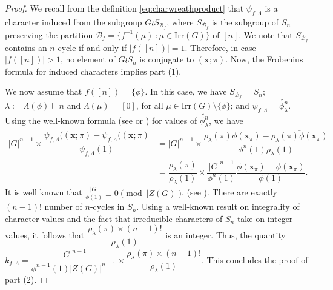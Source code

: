 \documentclass{amsart}
\theoremstyle{plain}
\theoremstyle{remark}\newtheorem{con}[theorem]{Construction}
\theoremstyle{remark} \newtheorem*{remark}{Remark}
\theoremstyle{remark} \newtheorem{example}{Example}
\newcommand{\mcal}{\mathcal}
\newcommand{\mbf}{\mathbf}
\newcommand{\ov}{\overline}
\newcommand{\irr}{\mathrm{Irr}}
\begin{document}
\begin{proof}
We recall from the definition \eqref{eq:charwreathproduct} that $\psi_{f,\Lambda}$ is a character induced from the subgroup $G\wr S_{\mcal{B}_{f}}$, where $S_{\mcal{B}_{f}}$ is the subgroup of $S_{n}$ preserving the partition $\mcal{B}_{f}=\{f^{-1}(\mu)\ : \mu \in \irr(G)\}$ of $[n]$. We note that $S_{\mcal{B}_{f}}$ contains an $n$-cycle if and only if $|f([n])|=1$. Therefore, in case $|f([n])|>1$, no element of $G \wr S_{n}$ is conjugate to $(\mbf{x}; \pi)$. Now, the Frobenius formula for induced characters implies part (1).

We now assume that $f([n])=\{\phi\}$. In this case, we have $S_{\mcal{B}_{f}}=S_{n}$; $\lambda:=\Lambda(\phi) \vdash n$ and $\Lambda(\mu)=[0]$, for all $\mu \in \irr(G)\setminus \{\phi\}$; and $\psi_{f,\Lambda}= \widetilde{\phi^{n}_{\lambda}}$. Using the well-known formula (see \cite[Lemma 4.3.9]{James_1984} or \cite[$(8.2)$, Appendix B]{macdonald1998symmetric}) for values of $\widetilde{\phi^{n}_{\lambda}}$, we have 
\begin{align*}
   |G|^{n-1}\times \dfrac{\psi_{f,\Lambda}((\mbf{x}; \pi)-\ov{\psi_{f,\Lambda}((\mbf{x}; \pi)}}{\psi_{f,\Lambda}(1) } & = |G|^{n-1} \times \dfrac{\rho_{\lambda}(\pi)\phi(\mbf{x}_{\pi})-\ov{\rho_{\lambda}(\pi)\phi(\mbf{x}_{\pi})}}{\phi^{n}(1) \rho_{\lambda}(1)}\\
    &= \dfrac{\rho_{\lambda}(\pi)}{\rho_{\lambda}(1)} \times\dfrac{|G|^{n-1}}{\phi^{n}(1)} \dfrac{\phi(\mbf{x}_{\pi})-\ov{\phi(\mbf{x}_{\pi})}}{\phi(1) }. 
\end{align*} 
 It is well known that $\frac{|G|}{\phi(1)} \equiv 0 \pmod{|Z(G)|}$. (see \cite[3.12]{isaacs1994character}). There are exactly $(n-1)!$ number of $n$-cycles in $S_{n}$. Using a well-known result \cite[Theorem 3.7]{isaacs1994character} on integrality of character values and the fact that irreducible characters of $S_{n}$ take on integer values, it follows that $\dfrac{\rho_{\lambda}(\pi)\times (n-1)!}{\rho_{\lambda}(1)}$ is an integer. Thus, the quantity $k_{f,\Lambda}= \dfrac{|G|^{n-1}}{\phi^{n-1}(1) |Z(G)|^{n-1}} \times \dfrac{\rho_{\lambda}(\pi)\times (n-1)!}{{\rho_{\lambda}(1)}}$. This concludes the proof of part (2).  
\end{proof}
\end{document}
